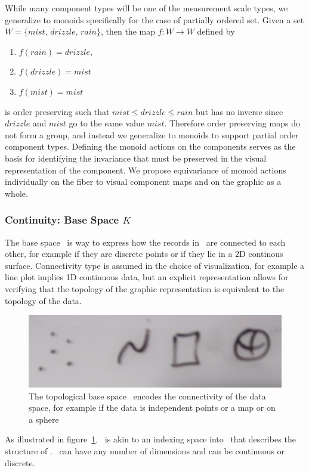 \documentclass[../main.tex]{subfiles}
\begin{document}
While many component types will be one of the measurement scale types, we generalize to monoids specifically for the case of partially ordered set. Given a set $W=\{mist, \, drizzle, \, rain \}$, then the map $f: W\rightarrow W$ defined by 
\begin{enumerate}
    \item $f(rain) = drizzle$,
    \item  $f(drizzle) = mist$ 
    \item $f(mist) = mist$
\end{enumerate}
is order preserving such that $mist \leq drizzle \leq rain$ but has no inverse since $drizzle$ and $mist$ go to the same value $mist$. Therefore order preserving maps do not form a group, and instead we generalize to monoids to support partial order component types. Defining the monoid actions on the components serves as the basis for identifying the invariance\cite{kindlmann2014algebraic} that must be preserved in the visual representation of the component. We propose equivariance of monoid actions individually on the fiber to visual component maps and on the graphic as a whole.

\subsubsection{Continuity: Base Space $K$} 
\label{sec:data_base}
The base space \dbase\ is way to express how the records in \dtotal\ are connected to each other, for example if they are discrete points or if they lie in a 2D continous surface. Connectivity type is assumed in the choice of visualization, for example a line plot implies 1D continuous data, but an explicit representation allows for verifying that the topology of the graphic representation is equivalent to the topology of the data.  

\begin{figure}[H]
    \includegraphics[width=.5\textwidth]{figures/math/k_different_types.png}
    \caption{The topological base space \dbase\ encodes the connectivity of the data space, for example if the data is independent points or a map or on a sphere}
    \label{fig:base_space_types}
\end{figure}
As illustrated in figure~\ref{fig:base_space_types}, \dbase\ is akin to an indexing space into \dtotal\ that describes the structure of \dtotal.  \dbase\ can have any number of dimensions and can be continuous or discrete. 
\end{document}
